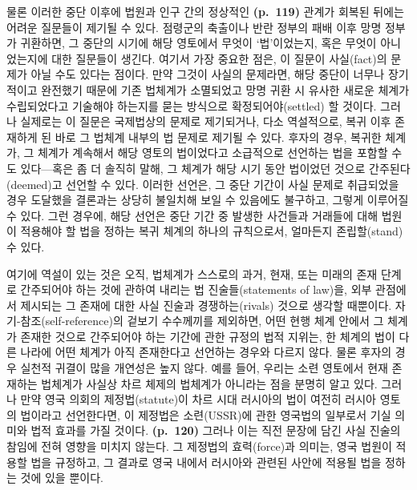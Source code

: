 물론 이러한 중단 이후에 법원과 인구 간의 정상적인 \textbf{(p.~119)}
관계가 회복된 뒤에는 어려운 질문들이 제기될 수 있다. 점령군의 축출이나
반란 정부의 패배 이후 망명 정부가 귀환하면, 그 중단의 시기에 해당
영토에서 무엇이 ‘법’이었는지, 혹은 무엇이 아니었는지에 대한 질문들이
생긴다. 여기서 가장 중요한 점은, 이 질문이 사실(fact)의 문제가 아닐 수도
있다는 점이다. 만약 그것이 사실의 문제라면, 해당 중단이 너무나
장기적이고 완전했기 때문에 기존 법체계가 소멸되었고 망명 귀환 시 유사한
새로운 체계가 수립되었다고 기술해야 하는지를 묻는 방식으로
확정되어야(settled) 할 것이다. 그러나 실제로는 이 질문은 국제법상의
문제로 제기되거나, 다소 역설적으로, 복귀 이후 존재하게 된 바로 그 법체계
내부의 법 문제로 제기될 수 있다. 후자의 경우, 복귀한 체계가, 그 체계가
계속해서 해당 영토의 법이었다고 소급적으로 선언하는 법을 포함할 수도
있다---혹은 좀 더 솔직히 말해, 그 체계가 해당 시기 동안 법이었던 것으로
간주된다(deemed)고 선언할 수 있다. 이러한 선언은, 그 중단 기간이 사실
문제로 취급되었을 경우 도달했을 결론과는 상당히 불일치해 보일 수
있음에도 불구하고, 그렇게 이루어질 수 있다. 그런 경우에, 해당 선언은
중단 기간 중 발생한 사건들과 거래들에 대해 법원이 적용해야 할 법을
정하는 복귀 체계의 하나의 규칙으로서, 얼마든지 존립할(stand) 수 있다.

여기에 역설이 있는 것은 오직, 법체계가 스스로의 과거, 현재, 또는 미래의
존재 단계로 간주되어야 하는 것에 관하여 내리는 법 진술들(statements of
law)을, 외부 관점에서 제시되는 그 존재에 대한 사실 진술과
경쟁하는(rivals) 것으로 생각할 때뿐이다. 자기-참조(self-reference)의
겉보기 수수께끼를 제외하면, 어떤 현행 체계 안에서 그 체계가 존재한
것으로 간주되어야 하는 기간에 관한 규정의 법적 지위는, 한 체계의 법이
다른 나라에 어떤 체계가 아직 존재한다고 선언하는 경우와 다르지 않다.
물론 후자의 경우 실천적 귀결이 많을 개연성은 높지 않다. 예를 들어,
우리는 소련 영토에서 현재 존재하는 법체계가 사실상 차르 체제의 법체계가
아니라는 점을 분명히 알고 있다. 그러나 만약 영국 의회의
제정법(statute)이 차르 시대 러시아의 법이 여전히 러시아 영토의 법이라고
선언한다면, 이 제정법은 소련(USSR)에 관한 영국법의 일부로서 기실 의미와
법적 효과를 가질 것이다. \textbf{(p.~120)} 그러나 이는 직전 문장에 담긴
사실 진술의 참임에 전혀 영향을 미치지 않는다. 그 제정법의 효력(force)과
의미는, 영국 법원이 적용할 법을 규정하고, 그 결과로 영국 내에서 러시아와
관련된 사안에 적용될 법을 정하는 것에 있을 뿐이다.

